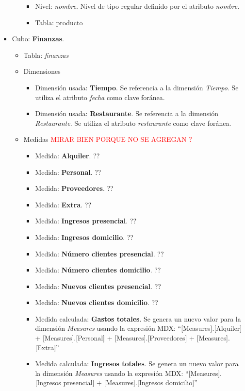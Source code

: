 \documentclass[12pt]{opticajnl}
\begin{document}
\begin{itemize}
\begin{itemize}
\begin{itemize}
\item Nivel: \textit{nombre}. Nivel de tipo regular definido por el atributo \textit{nombre}.
\item Tabla: producto
\end{itemize}
\end{itemize}
\item Cubo: \textbf{Finanzas}. 
\begin{itemize}
\item Tabla: \textit{finanzas}
\item Dimensiones 
\begin{itemize}
\item Dimensión usada: \textbf{Tiempo}. Se referencia a la dimensión \textit{Tiempo}. Se utiliza el atributo \textit{fecha} como clave foránea.
\item Dimensión usada: \textbf{Restaurante}. Se referencia a la dimensión \textit{Restaurante}. Se utiliza el atributo \textit{restaurante} como clave foránea.
\end{itemize}
\item Medidas \textcolor{red}{MIRAR BIEN PORQUE NO SE AGREGAN ?}
\begin{itemize}
\item Medida: \textbf{Alquiler}. ??
\item Medida: \textbf{Personal}. ??
\item Medida: \textbf{Proveedores}. ??
\item Medida: \textbf{Extra}. ??
\item Medida: \textbf{Ingresos presencial}. ??
\item Medida: \textbf{Ingresos domicilio}. ??
\item Medida: \textbf{Número clientes presencial}. ??
\item Medida: \textbf{Número clientes domicilio}. ??
\item Medida: \textbf{Nuevos clientes presencial}. ??
\item Medida: \textbf{Nuevos clientes domicilio}. ??
\item Medida calculada: \textbf{Gastos totales}. Se genera un nuevo valor para la dimensión \textit{Measures} usando la expresión MDX: ``[Measures].[Alquiler] + [Measures].[Personal] + [Measures].[Proveedores] + [Measures].[Extra]''
\item Medida calculada: \textbf{Ingresos totales}. Se genera un nuevo valor para la dimensión \textit{Measures} usando la expresión MDX: ``[Measures].[Ingresos presencial] + [Measures].[Ingresos domicilio]''

\end{itemize}
\end{itemize}
\end{itemize}
\end{document}
